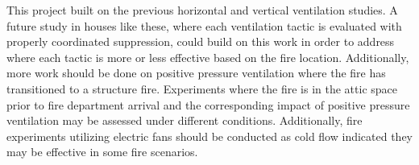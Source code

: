\documentclass{article}
\begin{document}
This project built on the previous horizontal and vertical ventilation studies. A future study in houses like these, where each ventilation tactic is evaluated with properly coordinated suppression, could build on this work in order to address where each tactic is more or less effective based on the fire location. Additionally, more work should be done on positive pressure ventilation where the fire has transitioned to a structure fire. Experiments where the fire is in the attic space prior to fire department arrival and the corresponding impact of positive pressure ventilation may be assessed under different conditions. Additionally, fire experiments utilizing electric fans should be conducted as cold flow indicated they may be effective in some fire scenarios.  

\clearpage

\glsaddall
\printglossary[nonumberlist]

\clearpage

\printbibliography

\clearpage
\end{document}
